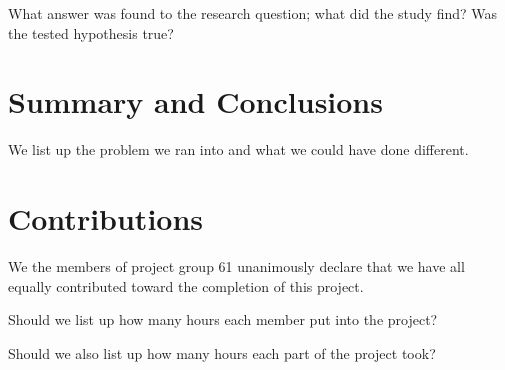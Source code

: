 \documentclass[a4paper,12pt]{article}
\begin{document}
What answer was found to the research question; what did the study find? Was the tested hypothesis true?

\section{Summary and Conclusions}
\label{sec:summary}



We list up the problem we ran into and what we could have done different. 




\section{Contributions}
\label{sec:contributions}
We the members of project group 61 unanimously declare that
we have all equally contributed toward the completion of this
project.

Should we list up how many hours each member put into the project?

Should we also list up how many hours each part of the project took?





\end{document}
